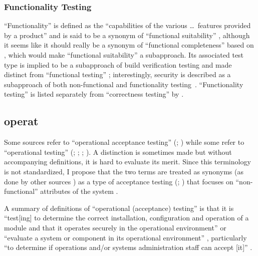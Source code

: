 \subsubsection{Functionality Testing}
``Functionality'' is defined as the
``capabilities of the various \dots\ features provided by a product''
\citep[p.~196]{IEEE2017} and is said to be a synonym of
``functional suitability'' \citepISTQB{}, although it seems
like it should really be a synonym of ``functional completeness'' based on
\citep{ISO_IEC2023a}, which would make ``functional suitability'' a
subapproach. Its associated test type
is implied to be a subapproach of build verification testing
\citepISTQB{} and made distinct from ``functional testing''%
\ifnotpaper; interestingly, security is described as a subapproach of both
non-functional and functionality testing\fi\ \citep[Tab.~2]{Gerrard2000a}.
``Functionality testing'' is listed separately from ``correctness testing'' by
\citet[p.~53]{Firesmith2015}.

\ifnotpaper
    \subsection[Operational (Acceptance) Testing (OAT)]{\acf{operat}}
    \label{oat-flaw}
    Some sources refer to ``operational acceptance testing'' (\citealp[p.~22]{IEEE2022};
    \citealpISTQB{}) while some refer to ``operational testing''
    (\citealp[p.~6-9,~in the context of software engineering operations]{SWEBOK2024};
    \citealp{ISO_IEC2018}; \citealp[p.~303]{IEEE2017};
    \citealp[pp.~4-6,~4-9]{SWEBOK2014}). A distinction is sometimes made
    \citep[p.~30]{Firesmith2015} but without accompanying definitions, it is hard
    to evaluate its merit. Since this terminology is not standardized, I
    propose that the two terms are treated as synonyms (as done by other sources
    \citep{LambdaTest2024, BocchinoAndHamilton1996}) as a type of
    acceptance testing (\citealp[p.~22]{IEEE2022}; \citealpISTQB{}) that focuses on
    ``non-functional'' attributes of the system \citep{LambdaTest2024}%
    .

    A summary of definitions of ``operational (acceptance) testing'' is that
    it is ``test[ing] to determine the correct
    installation, configuration and operation of a module and that it operates
    securely in the operational environment'' \citep{ISO_IEC2018} or ``evaluate a
    system or component in its operational environment'' \citep[p.~303]{IEEE2017},
    particularly ``to determine if operations and/or systems administration staff
    can accept [it]'' \citepISTQB{}.
\fi

